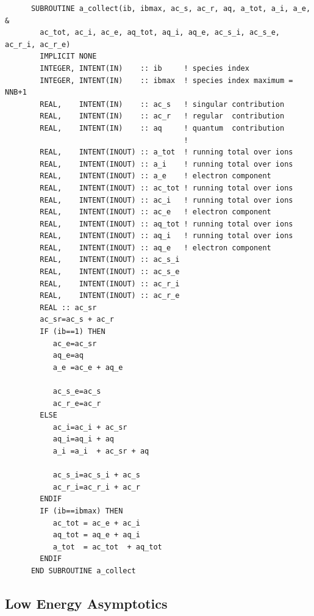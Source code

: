 \documentclass[preprint,12pt,eqsecnum,nofootinbib,amsmath,amssymb]{revtex4}
\begin{document}
{\begin{verbatim}
      SUBROUTINE a_collect(ib, ibmax, ac_s, ac_r, aq, a_tot, a_i, a_e, &
        ac_tot, ac_i, ac_e, aq_tot, aq_i, aq_e, ac_s_i, ac_s_e, ac_r_i, ac_r_e)
        IMPLICIT NONE
        INTEGER, INTENT(IN)    :: ib     ! species index
        INTEGER, INTENT(IN)    :: ibmax  ! species index maximum = NNB+1
        REAL,    INTENT(IN)    :: ac_s   ! singular contribution
        REAL,    INTENT(IN)    :: ac_r   ! regular  contribution
        REAL,    INTENT(IN)    :: aq     ! quantum  contribution
                                         !
        REAL,    INTENT(INOUT) :: a_tot  ! running total over ions
        REAL,    INTENT(INOUT) :: a_i    ! running total over ions
        REAL,    INTENT(INOUT) :: a_e    ! electron component
        REAL,    INTENT(INOUT) :: ac_tot ! running total over ions
        REAL,    INTENT(INOUT) :: ac_i   ! running total over ions
        REAL,    INTENT(INOUT) :: ac_e   ! electron component
        REAL,    INTENT(INOUT) :: aq_tot ! running total over ions
        REAL,    INTENT(INOUT) :: aq_i   ! running total over ions
        REAL,    INTENT(INOUT) :: aq_e   ! electron component
        REAL,    INTENT(INOUT) :: ac_s_i
        REAL,    INTENT(INOUT) :: ac_s_e
        REAL,    INTENT(INOUT) :: ac_r_i
        REAL,    INTENT(INOUT) :: ac_r_e
        REAL :: ac_sr
        ac_sr=ac_s + ac_r
        IF (ib==1) THEN
           ac_e=ac_sr
           aq_e=aq
           a_e =ac_e + aq_e

           ac_s_e=ac_s
           ac_r_e=ac_r
        ELSE
           ac_i=ac_i + ac_sr
           aq_i=aq_i + aq
           a_i =a_i  + ac_sr + aq

           ac_s_i=ac_s_i + ac_s
           ac_r_i=ac_r_i + ac_r
        ENDIF
        IF (ib==ibmax) THEN
           ac_tot = ac_e + ac_i
           aq_tot = aq_e + aq_i
           a_tot  = ac_tot  + aq_tot
        ENDIF
      END SUBROUTINE a_collect

\end{verbatim}
}


\subsection{Low Energy Asymptotics}
\end{document}

